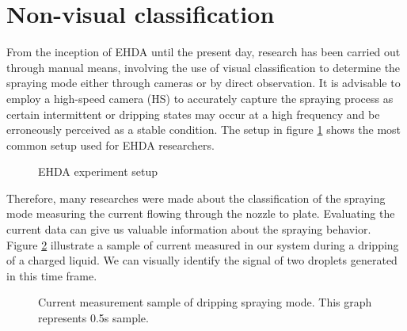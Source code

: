 \section{Non-visual classification}
\label{sec:non-visual-classification}

From the inception of EHDA until the present day, research has been carried out through manual means, involving the use of visual classification to determine the spraying mode either through cameras or by direct observation. It is advisable to employ a high-speed camera (HS) to accurately capture the spraying process as certain intermittent or dripping states may occur at a high frequency and be erroneously perceived as a stable condition.
The setup in figure \ref{fig:ehda_setup} shows the most common setup used for EHDA researchers.

\begin{figure}[H]
  \centering
  \caption{EHDA experiment setup \cite{Luewton}}
  \label{fig:ehda_setup}
\end{figure}


Therefore, many researches were made about the classification of the spraying mode measuring the current flowing through the nozzle to plate\cite{Sjaaks}\cite{Chen_Pui}. 
Evaluating the current data can give us valuable information about the spraying behavior.
Figure \ref{fig:microdripping_current_pic} illustrate a sample of current measured in our system during a dripping of a charged liquid. 
We can visually identify the signal of two droplets generated in this time frame.


\begin{figure}[H]
    \centering
    \caption{Current measurement sample of dripping spraying mode. This graph represents 0.5s sample.}
    \label{fig:microdripping_current_pic}
  \end{figure}

